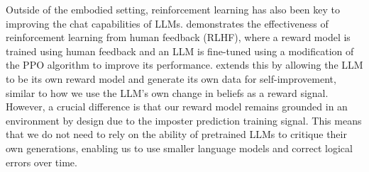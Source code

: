 Outside of the embodied setting, reinforcement learning has also been key to improving the chat capabilities of LLMs. \citet{ouyang2022training} demonstrates the effectiveness of reinforcement learning from human feedback (RLHF), where a reward model is trained using human feedback and an LLM is fine-tuned using a modification of the PPO algorithm to improve its performance. \citet{yuan2024selfrewarding} extends this by allowing the LLM to be its own reward model and generate its own data for self-improvement, similar to how we use the LLM's own change in beliefs as a reward signal. However, a crucial difference is that our reward model remains grounded in an environment by design due to the imposter prediction training signal. This means that we do not need to rely on the ability of pretrained LLMs to critique their own generations, enabling us to use smaller language models and correct logical errors over time.